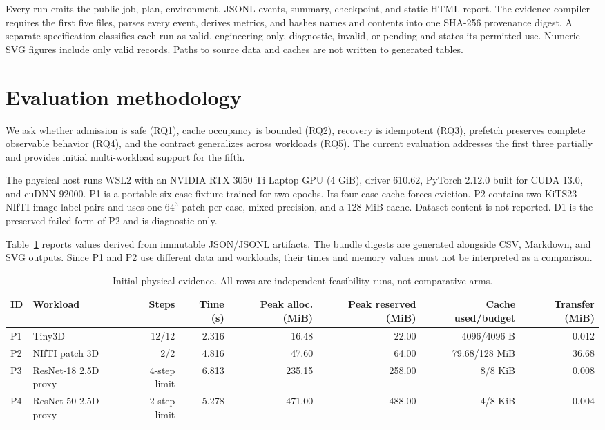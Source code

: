 \documentclass[10pt,twocolumn]{article}
\begin{document}
Every run emits the public job, plan, environment, JSONL events, summary,
checkpoint, and static HTML report. The evidence compiler requires the first
five files, parses every event, derives metrics, and hashes names and contents
into one SHA-256 provenance digest. A separate specification classifies each
run as valid, engineering-only, diagnostic, invalid, or pending and states its
permitted use. Numeric SVG figures include only valid records. Paths to source
data and caches are not written to generated tables.



\section{Evaluation methodology}

We ask whether admission is safe (RQ1), cache occupancy is bounded (RQ2),
recovery is idempotent (RQ3), prefetch preserves complete observable behavior
(RQ4), and the contract generalizes across workloads (RQ5). The current
evaluation addresses the first three partially and provides initial multi-workload
support for the fifth.

The physical host runs WSL2 with an NVIDIA RTX 3050 Ti Laptop GPU (4 GiB),
driver 610.62, PyTorch 2.12.0 built for CUDA 13.0, and cuDNN 92000. P1 is a
portable six-case fixture trained for two epochs. Its four-case cache forces
eviction. P2 contains two KiTS23 NIfTI image-label pairs and uses one $64^3$
patch per case, mixed precision, and a 128-MiB cache. Dataset content is not
reported. D1 is the preserved failed form of P2 and is diagnostic only.

Table~\ref{tab:initial} reports values derived from immutable JSON/JSONL
artifacts. The bundle digests are generated alongside CSV, Markdown, and SVG
outputs. Since P1 and P2 use different data and workloads, their times and
memory values must not be interpreted as a comparison.

\begin{table}[t]
\centering
\caption{Initial physical evidence. All rows are independent feasibility runs, not comparative arms.}
\label{tab:initial}
\begin{tabular}{llrrrrrr}
\toprule
ID & Workload & Steps & Time (s) & Peak alloc. (MiB) & Peak reserved (MiB) & Cache used/budget & Transfer (MiB) \\
\midrule
P1 & Tiny3D & 12/12 & 2.316 & 16.48 & 22.00 & 4096/4096 B & 0.012 \\
P2 & NIfTI patch 3D & 2/2 & 4.816 & 47.60 & 64.00 & 79.68/128 MiB & 36.68 \\
P3 & ResNet-18 2.5D proxy & 4-step limit & 6.813 & 235.15 & 258.00 & 8/8 KiB & 0.008 \\
P4 & ResNet-50 2.5D proxy & 2-step limit & 5.278 & 471.00 & 488.00 & 4/8 KiB & 0.004 \\
\bottomrule
\end{tabular}
\end{table}
\end{document}
